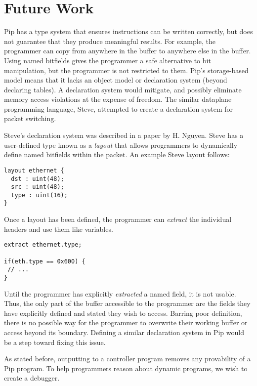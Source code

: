 
\section{Future Work}
Pip has a type system that ensures instructions can be written correctly, but does not guarantee that they produce meaningful results. For example, the programmer can copy from anywhere in the buffer to anywhere else in the buffer. Using named bitfields gives the programmer a safe alternative to bit manipulation, but the programmer is not restricted to them. Pip's storage-based model means that it lacks an object model or declaration system (beyond declaring tables). A declaration system would mitigate, and possibly eliminate memory access violations at the expense of freedom. The similar dataplane programming language, Steve, attempted to create a declaration system for packet switching.

Steve's declaration system was described in a paper by H. Nguyen. Steve has a user-defined type known as a \textit{layout} that allows programmers to dynamically define named bitfields within the packet. An example Steve layout follows:
\begin{mdframed}
\begin{verbatim}
layout ethernet {
  dst : uint(48);
  src : uint(48);
  type : uint(16);
}
\end{verbatim}
\end{mdframed}
Once a layout has been defined, the programmer can \textit{extract} the individual headers and use them like variables.
\begin{mdframed}
\begin{verbatim}
extract ethernet.type;

if(eth.type == 0x600) {
 // ...
}
\end{verbatim}
\end{mdframed}
Until the programmer has explicitly \textit{extracted} a named field, it is not usable. Thus, the only part of the buffer accessible to the programmer are the fields they have explicitly defined and stated they wish to access. Barring poor definition, there is no possible way for the programmer to overwrite their working buffer or access beyond its boundary. Defining a similar declaration system in Pip would be a step toward fixing this issue.

As stated before, outputting to a controller program removes any provability of a Pip program. To help programmers reason about dynamic programs, we wish to create a debugger.

